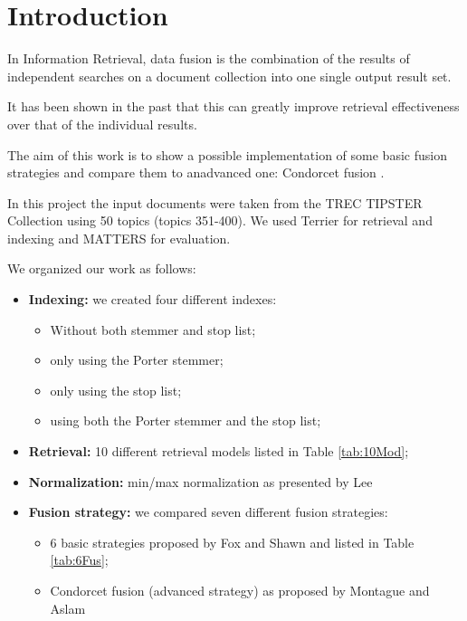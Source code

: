 


    \printTitle
    \newpage
    \tableofcontents
    \newpage

    \section{Introduction}
    
    In Information Retrieval, data fusion is the combination of the results
    of independent searches on a document collection into one single output
    result set.
    
    It has been shown in the past that this can greatly improve retrieval
    effectiveness over that of the individual results.
    
    The aim of this work is to show a possible implementation of some basic
    fusion strategies and compare them to anadvanced one: Condorcet fusion \cite{3}.

    In this project the input documents were taken from the TREC TIPSTER Collection using 50 topics (topics 351-400).
    We used Terrier for retrieval and indexing and MATTERS for evaluation.
    
    We organized our work as follows:

    \begin{itemize}
        \item \textbf{Indexing:} we created four different indexes:
        \begin{itemize}
        	\item Without both stemmer and stop list;
        	\item only using the Porter stemmer;
        	\item only using the stop list;
        	\item using both the Porter stemmer and the stop list;
        \end{itemize}
        \item \textbf{Retrieval:} 10 different retrieval models listed in Table \ref{tab:10Mod};
		\item \textbf{Normalization:} min/max normalization as presented by Lee \cite{1}
        \item \textbf{Fusion strategy:} we compared seven different fusion strategies:
            \begin{itemize}
                \item 6 basic strategies proposed by Fox and Shawn \cite{2} and listed in Table \ref{tab:6Fus};
                \item Condorcet fusion (advanced strategy) as proposed by Montague and Aslam \cite{3}
            \end{itemize}
    \end{itemize}

